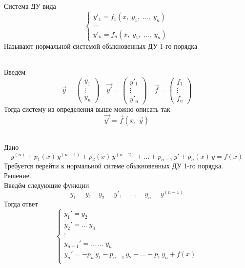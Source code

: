 \begin{Def}~\\
    Система ДУ вида
    \[
        \begin{cases}
            y'_1 = f_1(x,\; y_1,\; \dots,\; y_n)\\
            \dots\\
            y'_n = f_n(x,\; y_1,\; \dots,\; y_n)
        \end{cases}
    \]
    Называют нормальной системой обыкновенных ДУ 1-го порядка
\end{Def}

\begin{Note}~\\
    Введём 
    \[
        \vec{y} = \begin{pmatrix} y_1\\ \vdots\\ y_n \end{pmatrix} \quad \vec{y'} = \begin{pmatrix} y'_1\\ \vdots\\ y'_n \end{pmatrix} \quad \vec{f} = \begin{pmatrix} f_1\\ \vdots\\ f_n \end{pmatrix}
    \]
    Тогда систему из определения выше можно описать так
    \[
        \vec{y'} = \vec{f}(x,\; \vec{y})
    \]
\end{Note}

\begin{Example}~\\
    Дано
    \[
        y^{(n)} + p_1(x)\,y^{(n-1)} + p_2(x)\,y^{(n-2)} + \dots + p_{n-1}\,y' + p_n(x)\,y = f(x)
    \]
    Требуется перейти к нормальной ситеме обыкновенных ДУ 1-го порядка.\\
    Решение.\\
    Введём следующие функции
    \[
        y_1 = y, \quad y_2 = y', \quad \dots, \quad y_n = y^{(n-1)}
    \]
    Тогда ответ
    \[
        \begin{cases}
            y_1' = y_2\\
            y_2' = \dots \; y_3\\
            \vdots\\
            y_{n-1}' = \dots \; \dots \; y_n\\
            y_n' = -p_n\,y_1 - p_{n-1}\,y_2 - \dots - p_1\,y_n + f(x)\\
        \end{cases}
    \]
\end{Example}


